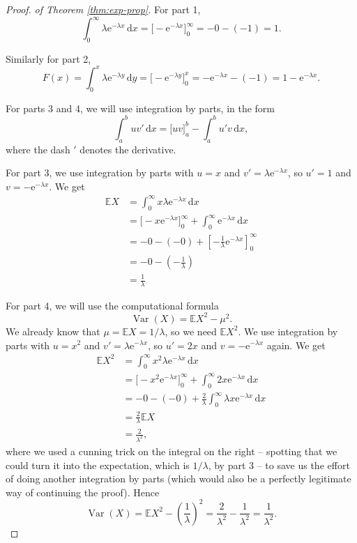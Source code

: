 \documentclass[
  a4paper,
]{book}
\theoremstyle{definition}
\theoremstyle{definition}
\theoremstyle{definition}
\theoremstyle{definition}
\theoremstyle{remark}
\begin{document}
\begin{proof}
\emph{of Theorem \ref{thm:exp-prop}.}
For part 1,
\[ \int_0^\infty \lambda \mathrm{e}^{-\lambda x}\,\mathrm{d}x
     = \big[-\mathrm{e}^{-\lambda x} \big]_0^\infty = -0 -(-1) = 1 . \]

Similarly for part 2,
\[ F(x) = \int_0^x \lambda \mathrm{e}^{-\lambda y}\,\mathrm{d}y
     = \big[-\mathrm{e}^{-\lambda y} \big]_0^x = -\mathrm{e}^{-\lambda x} -(-1) = 1 - \mathrm{e}^{-\lambda x}. \]

For parts 3 and 4, we will use integration by parts, in the form
\[ \int_a^b uv' \, \mathrm dx = \big[uv\big]_a^b - \int_a^b u'v \, \mathrm dx , \]
where the dash \('\) denotes the derivative.

For part 3, we use integration by parts with \(u = x\) and \(v' = \lambda \mathrm{e}^{-\lambda x}\), so \(u' = 1\) and \(v = -\mathrm{e}^{-\lambda x}\). We get
\begin{align*}
\mathbb EX &= \int_0^\infty x  \lambda \mathrm{e}^{-\lambda x}\,\mathrm{d}x \\
  &= \big[-x \mathrm{e}^{-\lambda x}\big]_0^\infty + \int_0^\infty \mathrm{e}^{-\lambda x}\,\mathrm{d}x \\
  &= -0 - (-0) + \left[ -\frac{1}{\lambda} \mathrm{e}^{-\lambda x} \right]_0^\infty \\
  &= -0 - \left(- \frac{1}{\lambda}\right) \\
  &= \frac{1}{\lambda}
\end{align*}

For part 4, we will use the computational formula
\[ \operatorname{Var}(X) = \mathbb EX^2 - \mu^2 . \]
We already know that \(\mu = \mathbb EX = 1/\lambda\), so we need \(\mathbb EX^2\). We
use integration by parts with \(u = x^2\) and \(v' = \lambda \mathrm{e}^{-\lambda x}\), so \(u' = 2x\) and \(v = -\mathrm{e}^{-\lambda x}\) again. We get
\begin{align*}
\mathbb EX^2 &= \int_0^\infty x^2  \lambda \mathrm{e}^{-\lambda x}\,\mathrm{d}x \\
  &= \big[-x^2 \mathrm{e}^{-\lambda x}\big]_0^\infty + \int_0^\infty 2x \mathrm{e}^{-\lambda x}\,\mathrm{d}x \\
  &= -0 - (-0) + \frac{2}{\lambda} \int_0^\infty \lambda x \mathrm{e}^{-\lambda x}\,\mathrm{d}x \\
  &= \frac{2}{\lambda} \mathbb EX \\
  &= \frac{2}{\lambda^2} ,
\end{align*}
where we used a cunning trick on the integral on the right -- spotting that we could turn it into the expectation, which is \(1/\lambda\), by part 3 -- to save us the effort of doing another integration by parts (which would also be a perfectly legitimate way of continuing the proof).
Hence
\[ \operatorname{Var}(X) = \mathbb EX^2 - \left(\frac{1}{\lambda}\right)^2 =  \frac{2}{\lambda^2} - \frac{1}{\lambda^2} = \frac{1}{\lambda^2} .  \]
\end{proof}
\end{document}
